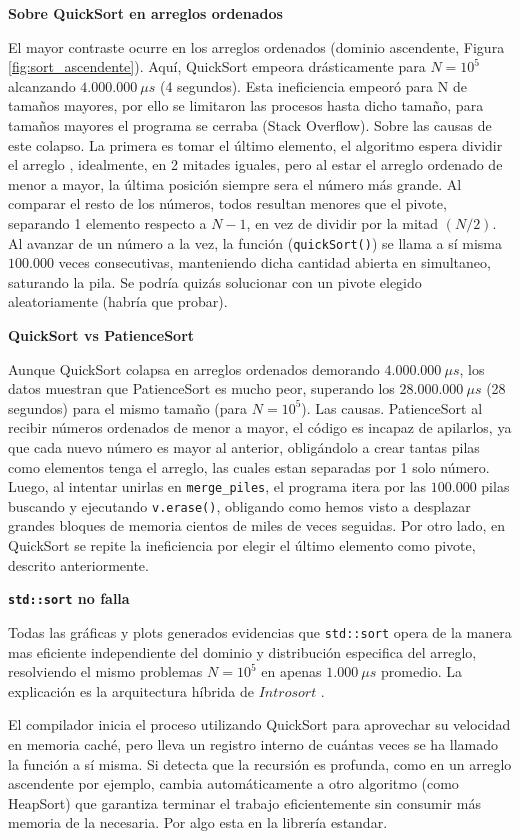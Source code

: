 \textbf{Sobre QuickSort en arreglos ordenados}

El mayor contraste ocurre en los arreglos ordenados (dominio ascendente, Figura \ref{fig:sort_ascendente}). Aquí, QuickSort empeora drásticamente para $N=10^5$ alcanzando  $4.000.000\ \mu s$ (4 segundos). Esta ineficiencia empeoró para N de tamaños mayores, por ello se limitaron las procesos hasta dicho tamaño, para tamaños mayores el programa se cerraba (Stack Overflow). Sobre las causas de este colapso. La primera es tomar el último elemento, el algoritmo espera dividir el arreglo , idealmente, en 2 mitades iguales, pero al estar el arreglo ordenado de menor a mayor, la última posición siempre sera el número más grande. Al comparar el resto de los números, todos resultan menores que el pivote, separando 1 elemento respecto a $N-1$, en vez de dividir por la mitad $(N/2)$. Al avanzar de un número a la vez, la función (\texttt{quickSort()}) se llama a sí misma $100.000$ veces consecutivas, manteniendo dicha cantidad abierta en simultaneo, saturando la pila. Se podría quizás solucionar con un pivote elegido aleatoriamente (habría que probar). 

\textbf{QuickSort vs PatienceSort}

Aunque QuickSort colapsa en arreglos ordenados demorando $4.000.000\ \mu s$, los datos muestran que PatienceSort es mucho peor, superando los $28.000.000\ \mu s$ (28 segundos) para el mismo tamaño (para $N=10^{5}$). Las causas. PatienceSort al recibir números ordenados de menor a mayor, el código es incapaz de apilarlos, ya que cada nuevo número es mayor al anterior, obligándolo a crear tantas pilas como elementos tenga el arreglo, las cuales estan separadas por 1 solo número. Luego, al intentar unirlas en \texttt{merge\_piles}, el programa itera por las $100.000$ pilas buscando y ejecutando \texttt{v.erase()}, obligando como hemos visto a desplazar grandes bloques de memoria cientos de miles de veces seguidas. Por otro lado, en QuickSort se repite la ineficiencia por elegir el último elemento como pivote, descrito anteriormente. 

\textbf{\texttt{std::sort} no falla}

Todas las gráficas y plots generados evidencias que \texttt{std::sort} opera de la manera mas eficiente independiente del dominio y distribución especifica del arreglo, resolviendo el mismo problemas $N=10^{5}$ en apenas $1.000\ \mu s$ promedio. La explicación es la arquitectura híbrida de $Introsort$ \cite{cppreference_sort}.

El compilador inicia el proceso utilizando QuickSort para aprovechar su velocidad en memoria caché, pero lleva un registro interno de cuántas veces se ha llamado la función a sí misma. Si detecta que la recursión es profunda, como en un arreglo ascendente por ejemplo, cambia automáticamente a otro algoritmo (como HeapSort) que garantiza terminar el trabajo eficientemente sin consumir más memoria de la necesaria. Por algo esta en la librería estandar. 


